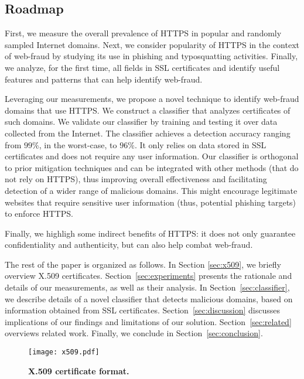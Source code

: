 \documentclass[twocolumn]{article}
\begin{document}
\subsection{Roadmap}
First, we measure the overall prevalence of HTTPS in popular and randomly 
sampled Internet domains. Next, we consider popularity of HTTPS 
in the context of web-fraud by studying its use in phishing and 
typosquatting activities. Finally, we analyze, for the first time, all fields in SSL 
certificates and  
identify useful features and patterns that can help identify web-fraud.

Leveraging our measurements, we propose a novel technique to identify web-fraud domains that use
HTTPS. We construct a classifier that analyzes certificates of such domains.
We validate our classifier by training and testing it over data 
collected from the Internet. The classifier achieves a detection 
accuracy ranging from $99\%$, in the worst-case, to $96\%$. It only relies on data stored in SSL certificates and does not require any user information.
Our classifier is orthogonal to prior mitigation techniques and can be integrated with other methods 
(that do not rely on HTTPS), thus improving overall effectiveness and facilitating detection of a wider range of malicious domains.
This might encourage legitimate websites that require sensitive user information (thus, potential 
phishing targets) to enforce HTTPS.

Finally, we highligh some indirect benefits of HTTPS: it does not 
only guarantee confidentiality and authenticity, but can also help combat web-fraud.




\vspace{0.3cm} The rest of the paper is organized as follows. In Section \ref{sec:x509}, we briefly overview
X.509 certificates. Section~\ref{sec:experiments} presents the rationale and details of our measurements, as well as their analysis. 
In Section~\ref{sec:classifier}, we describe details of a novel classifier that detects malicious 
domains, based on information obtained from SSL certificates.
Section~\ref{sec:discussion} discusses implications of our findings and limitations of our solution. Section~\ref{sec:related}
overviews related work. Finally, we conclude in Section~\ref{sec:conclusion}.




\begin{figure}[t]
  \centering
  \texttt{[image: x509.pdf]}
  \caption{\label{fig:x509format} {\small \bf X.509 certificate format.\vspace{-0.4cm}}}
\end{figure}
\end{document}
